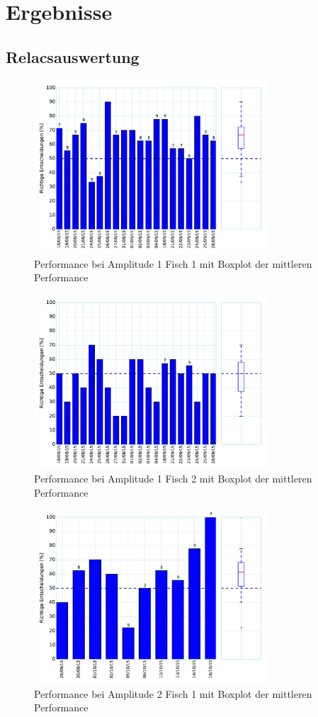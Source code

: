 \chapter{Ergebnisse}


\section{Relacsauswertung}


\begin{figure}[ht]
\includegraphics[height=6.5cm]{Abbildungen/Amplitude1_Fisch1}
\caption{\label{fig:amplitude1_1} Performance bei Amplitude 1 Fisch 1 mit Boxplot der mittleren Performance}
\end{figure}

\begin{figure}[ht]
\includegraphics[height=6.5cm]{Abbildungen/Amplitude1_Fisch2}
\caption{\label{fig:amplitude1_2} Performance bei Amplitude 1 Fisch 2 mit Boxplot der mittleren Performance}
\end{figure}

\begin{figure}[ht]
\includegraphics[height=6.5cm]{Abbildungen/Amplitude2_Fisch1}
\caption{\label{fig:amplitude2_1} Performance bei Amplitude 2 Fisch 1 mit Boxplot der mittleren Performance}
\end{figure}

